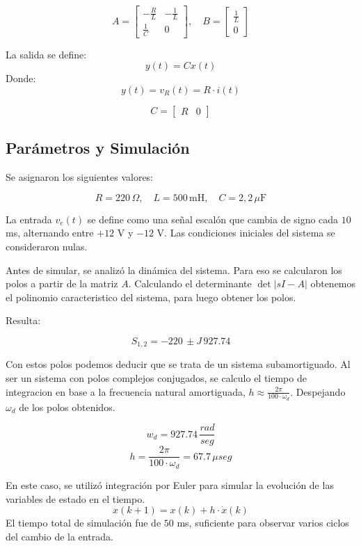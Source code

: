 \documentclass{article}
\begin{document}
\[
A = 
\begin{bmatrix}
-\frac{R}{L} & -\frac{1}{L} \\
\frac{1}{C} & 0
\end{bmatrix}, \quad
B =
\begin{bmatrix}
\frac{1}{L} \\
0
\end{bmatrix}
\]

La salida se define:
\[
y(t) = C x(t) \]
Donde: 
\[y(t) = v_R(t) = R \cdot i(t)\] 
 
\[
C = 
\begin{bmatrix}
R & 0
\end{bmatrix}
\]

\subsection*{Parámetros y Simulación}

Se asignaron los siguientes valores:

\[
R = 220 \, \Omega, \quad L = 500 \, \text{mH}, \quad C = 2{,}2 \, \mu\text{F}
\]

La entrada $v_e(t)$ se define como una señal escalón que cambia de signo cada $10$ ms, alternando entre $+12$ V y $-12$ V. Las condiciones iniciales del sistema se consideraron nulas.

Antes de simular, se analizó la dinámica del sistema. Para eso se calcularon los polos a partir de la matriz $A$. Calculando el determinante \( \det|sI - A| \) obtenemos el polinomio caracteristico del sistema, para luego obtener los polos.

Resulta: 

$$S_{1,2}=-220 \, \pm J \, 927.74 $$

Con estos polos podemos deducir que se trata de un sistema subamortiguado. Al ser un sistema con polos complejos conjugados, se calculo el tiempo de integracion en base a la frecuencia natural amortiguada,  $h \approx \frac{2\pi}{100 \cdot \omega_d}$. Despejando $\omega_d$ de los polos obtenidos. 

\[w_d=927.74 \, \frac{rad}{seg}\] 
\[ h=\frac{2\pi}{100 \cdot \omega_d} =67.7\,\mu seg\]


En este caso, se utilizó integración por Euler para simular la evolución de las variables de estado en el tiempo.
\begin{equation*}
    x(k+1) = x(k) + h \cdot \dot{x}(k)
\end{equation*}
El tiempo total de simulación fue de $50$ ms, suficiente para observar varios ciclos del cambio de la entrada.
\end{document}
